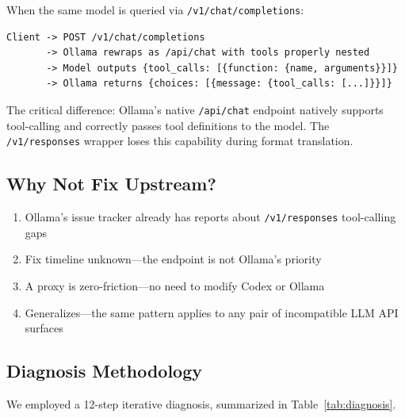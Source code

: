 \documentclass[11pt,a4paper]{article}
\begin{document}
When the same model is queried via \texttt{/v1/chat/completions}:

\begin{lstlisting}
Client -> POST /v1/chat/completions
       -> Ollama rewraps as /api/chat with tools properly nested
       -> Model outputs {tool_calls: [{function: {name, arguments}}]}
       -> Ollama returns {choices: [{message: {tool_calls: [...]}}]}
\end{lstlisting}

The critical difference: Ollama's native \texttt{/api/chat} endpoint
natively supports tool-calling and correctly passes tool definitions to the
model. The \texttt{/v1/responses} wrapper loses this capability during
format translation.

\subsection{Why Not Fix Upstream?}

\begin{enumerate}[nosep]
  \item Ollama's issue tracker already has reports about
        \texttt{/v1/responses} tool-calling gaps
  \item Fix timeline unknown---the endpoint is not Ollama's priority
  \item A proxy is zero-friction---no need to modify Codex or Ollama
  \item Generalizes---the same pattern applies to any pair of incompatible
        LLM API surfaces
\end{enumerate}

\subsection{Diagnosis Methodology}

We employed a 12-step iterative diagnosis, summarized in Table~\ref{tab:diagnosis}.
\end{document}

